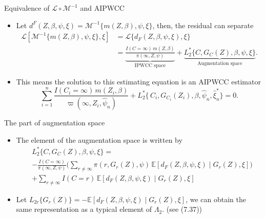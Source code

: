 \documentclass[xcolor=dvipsnames,aspectratio=169]{beamer}
\newcommand{\E}{\mathbb{E}}
\newcommand{\1}{\mathbbm{1}}
\begin{document}
\begin{frame}{Equivalence of $\mathcal{L}\circ \mathcal{M}^{-1}$ and AIPWCC}
  \begin{tcolorbox}[colframe=Cyan,title=Theorem 10.7 - (i)]
    \begin{itemize}
        \item Let $d^F(Z,\beta,\psi,\xi) = \mathcal{M}^{-1}\{m(Z,\beta),\psi,\xi\}$, then, the residual can separate
        \begin{align*}
          \mathcal{L}[\mathcal{M}^{-1}\{m(Z,\beta),\psi,\xi\},\xi]
            &= \mathcal{L}\{d_F(Z,\beta,\psi,\xi),\xi\} \\
            &=\underbrace{\frac{I(C=\infty)\,m(Z,\beta)}{\pi(\infty,Z,\psi)}}_{\text{IPWCC space}}
            + \underbrace{L^{\ast}_2\{C,G_C(Z),\beta,\psi,\xi\}}_{\text{Augmentation space}}.
        \end{align*}
    \end{itemize}
\end{tcolorbox}
  \begin{itemize}
    \item This means the solution to this estimating equation is an AIPWCC estimator
    \[
    \sum_{i=1}^{n}
  \frac{I(C_{i}=\infty)\,m(Z_{i},\beta)}
       {\varpi(\infty,Z_{i},\hat{\psi}_{n})}
  + L^{\ast}_{2}\{\,C_{i},G_{C_{i}}(Z_{i}),\beta,\hat{\psi}_{n},\hat{\xi}^{\ast}_{n}\}
= 0.
    \]
  \end{itemize}
\end{frame}

\begin{frame}{The part of augmentation space}
  \begin{tcolorbox}[colframe=Cyan,title=Theorem 10.7 - (ii)]
    \begin{itemize}
        \item The element of the augmentation space is written by
        \begin{align*}
          &L^{\ast}_2\{C,G_C(Z),\beta,\psi,\xi\}
            =\\  &- \frac{I(C=\infty)}{\pi(\infty,Z,\psi)}
            \Bigg(\sum_{r\neq\infty}\pi(r,G_r(Z),\psi)\,
            \E[d_F(Z,\beta,\psi,\xi)\mid G_r(Z),\xi]\Bigg) \\
            &+ \sum_{r\neq\infty} I(C=r)\,
            \E[d_F(Z,\beta,\psi,\xi)\mid G_r(Z),\xi]
        \end{align*}
    \end{itemize}
\end{tcolorbox}
\begin{itemize}
  \item Let $L_{2r}\{G_r(Z)\}=-\E[d_F(Z,\beta,\psi,\xi)\mid G_r(Z),\xi]$, we can obtain the same representation as a typical element of $\Lambda_2$. (see (7.37))
\end{itemize}
\end{frame}
\end{document}
